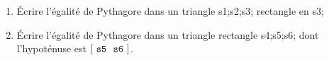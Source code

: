 \documentclass[exercice]{thedocument}%
\begin{document}
%
\begin{enumerate}
    \item Écrire l'égalité de Pythagore dans un triangle \textsf{\<s1;\<s2;\<s3;}
    rectangle en \textsf{\<s3;}
    \item Écrire l'égalité de Pythagore dans un triangle rectangle
    \textsf{\<s4;\<s5;\<s6;} dont l'hypoténuse est
    $[\textsf{\<s5;}\textsf{\<s6;}]$.
\end{enumerate}
\end{document}
